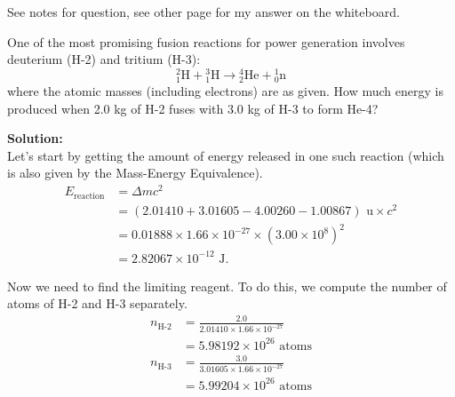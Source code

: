 \documentclass[a4paper, 12pt, addpoints]{exam}
\begin{document}
\begin{questions}

\question See notes for question, see other page for my answer on the whiteboard.

\question One of the most promising fusion reactions for power generation involves deuterium (H-2) and tritium (H-3):
$${}^2_1\text{H} + {}^3_1\text{H} \xrightarrow{} {}^4_2\text{He} + {}^1_0\text{n}$$
where the atomic masses (including electrons) are as given. How much energy is produced when 2.0 kg of H-2 fuses with 3.0 kg of H-3 to form He-4?
\begin{tcolorbox}
\textbf{Solution:}\\
Let's start by getting the amount of energy released in one such reaction (which is also given by the Mass-Energy Equivalence).
\begin{align*}
E_\text{reaction} &= \Delta mc^2 \\
&= (2.01410 + 3.01605 - 4.00260 - 1.00867)\text{ u} \times c^2 \\
&= 0.01888 \times 1.66 \times 10^{-27} \times (3.00\times 10^8)^2 \\
&= 2.82067 \times 10^{-12}\text{ J}.
\end{align*}

Now we need to find the limiting reagent. To do this, we compute the number of atoms of H-2 and H-3 separately.
\begin{align*}
n_\text{H-2} &= \frac{2.0}{2.01410 \times 1.66 \times 10^{-27}} \\
&= 5.98192 \times 10^{26}\text{ atoms} \\
n_\text{H-3} &= \frac{3.0}{3.01605 \times 1.66 \times 10^{-27}} \\
&= 5.99204 \times 10^{26}\text{ atoms}
\end{align*}


\end{tcolorbox}
\end{questions}
\end{document}
